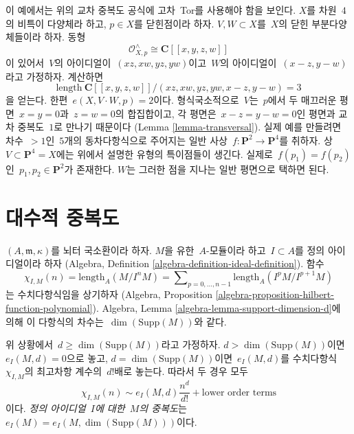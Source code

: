 \begin{example}
\label{example-naive-multiplicity-wrong}
이 예에서는 위의 교차 중복도 공식에 고차\  Tor를 사용해야 함을 보인다.
$X$를 차원\  $4$의 비특이 다양체라 하고, $p \in X$를 닫힌점이라 하자.
$V, W \subset X$를\  $X$의 닫힌 부분다양체들이라 하자. 동형
$$
\mathcal{O}_{X, p}^\wedge \cong \mathbf{C}[[x, y, z, w]]
$$
이 있어서\  $V$의 아이디얼이\  $(xz, xw, yz, yw)$이고\  $W$의 아이디얼이\ 
$(x - z, y - w)$라고 가정하자. 계산하면
$$
\text{length}\ \mathbf{C}[[x, y, z, w]]/
(xz, xw, yz, yw, x - z, y - w) = 3
$$
을 얻는다. 한편\  $e(X, V \cdot W, p) = 2$이다.
형식국소적으로\  $V$는\  $p$에서 두 매끄러운 평면\ 
$x = y = 0$과\  $z = w = 0$의 합집합이고, 각 평면은\ 
$x - z = y - w = 0$인 평면과 교차 중복도\  $1$로 만나기 때문이다
(Lemma \ref{lemma-transversal}).
실제 예를 만들려면 차수\  $> 1$인\  $5$개의 동차다항식으로 주어지는 일반
사상\  $f : \mathbf{P}^2 \to \mathbf{P}^4$를 취하자.
상\  $V \subset \mathbf{P}^4 = X$에는 위에서 설명한 유형의 특이점들이
생긴다. 실제로\  $f(p_1) = f(p_2)$인\ 
$p_1, p_2 \in \mathbf{P}^2$가 존재한다. $W$는 그러한 점을 지나는 일반
평면으로 택하면 된다.
\end{example}






\section{대수적 중복도}
\label{section-multiplicities}

\noindent
$(A, \mathfrak m, \kappa)$를 뇌터 국소환이라 하자.
$M$을 유한\  $A$-모듈이라 하고\  $I \subset A$를 정의 아이디얼이라 하자
(Algebra, Definition \ref{algebra-definition-ideal-definition}).
함수
$$
\chi_{I, M}(n) = \text{length}_A(M/I^nM) =
\sum\nolimits_{p = 0, \ldots, n - 1} \text{length}_A(I^pM/I^{p + 1}M)
$$
는 수치다항식임을 상기하자
(Algebra, Proposition \ref{algebra-proposition-hilbert-function-polynomial}).
Algebra, Lemma \ref{algebra-lemma-support-dimension-d}에 의해 이 다항식의
차수는\  $\dim(\text{Supp}(M))$와 같다.

\begin{definition}
\label{definition-multiplicity}
위 상황에서\  $d \geq \dim(\text{Supp}(M))$라고 가정하자.
$d > \dim(\text{Supp}(M))$이면\  $e_I(M, d) = 0$으로 놓고,
$d = \dim(\text{Supp}(M))$이면\  $e_I(M, d)$를 수치다항식\ 
$\chi_{I, M}$의 최고차항 계수의\  $d!$배로 놓는다.
따라서 두 경우 모두
$$
\chi_{I, M}(n) \sim e_I(M, d) \frac{n^d}{d!} + \text{lower order terms}
$$
이다. {\it 정의 아이디얼\  $I$에 대한\  $M$의 중복도}는\ 
$e_I(M) = e_I(M, \dim(\text{Supp}(M)))$이다.
\end{definition}


